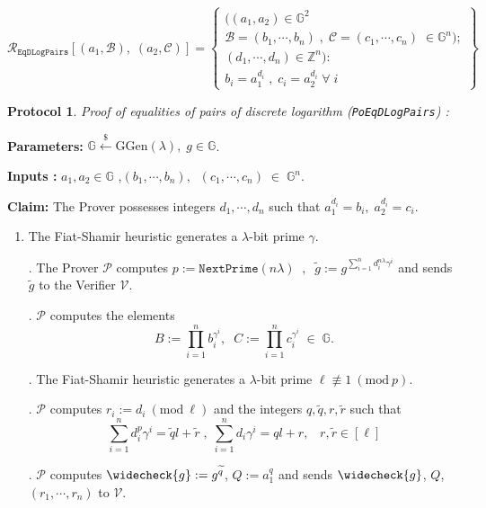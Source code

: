 \documentclass[11pt, lettersize, notitlepage, leqno, footskip=0.6cm]{article}
\newcommand{\slim}{\sum\limits}
\newcommand{\ttt}{\texttt}
\newcommand{\wti}{\widetilde}
\newcommand{\mc}{\mathcal}
\newcommand{\mb}{\mathbb}
\newcommand{\mr}{\mathrm}
\newcommand{\lam}{\lambda}
\newcommand{\lamb}{\lambda}
\newcommand{\weck}{\widecheck}
\newcommand{\mP}{\mc{P}}
\newcommand{\V}{\mc{V}}
\newcommand{\vs}{\vspace{-0.15cm}}
\newcommand{\noin}{\noindent}
\newcommand{\Mod}[1]{\ (\mathrm{mod}\ #1)}
\newtheorem{Prot}[Thm]{Protocol}
\numberwithin{equation}{section}
\begin{document}
{\[
  \mc{R}_{{\ttt{EqDLogPairs}}}[(a_1, \mc{B}),\; (a_2, \mc{C})] = \left\{\begin{array}{l}
  	((a_1, a_2)\in\mb{G}^2\\
    \mc{B} = (b_1,\cdots, b_n)\;,\;\mc{C} = (c_1,\cdots, c_n)\;\in\mb{G}^n);\\
    (d_1,\cdots,d_n)\in\mb{Z}^n): \\
    b_i = a_1^{d_i}\;,\;c_i = a_2^{d_i} \;\forall\;i
  \end{array}\right\}
\]

\vspace{0.2cm}


\begin{Prot} \normalfont \textit{Proof of equalities of pairs of discrete logarithm} (\verb|PoEqDLogPairs|) :\end{Prot} \vspace{-0.3cm}

\noindent \textbf{Parameters:} $\mb{G}\xleftarrow{\$} \mr{GGen}(\lamb), \; g\in \mb{G}$.

\noindent \textbf{Inputs :} $a_1,a_2\in\mb{G}$  \;,\;$(b_1,\cdots, b_n), \;\;(c_1,\cdots, c_n)\;\in\; \mb{G}^n$.


\noindent \textbf{Claim:} The Prover possesses integers $d_1,\cdots, d_n$ such that $a_1^{d_i} = b_i,\; a_2^{d_i} = c_i$.

\begin{enumerate}[wide, labelwidth=!, labelindent=0pt]\vs \item The Fiat-Shamir heuristic generates a $\lam$-bit prime $\gamma$.

\noin 2. The Prover $\mP$ computes $p:= \ttt{NextPrime}(n\lam)\;\;,\;\;\wti{g} := g^{\slim_{i=1}^n d_i^{n\lam}\gamma^i}$ and sends $\wti{g}$ to the Verifier $\V$.
 
\noin 3. $\mc{P}$ computes the elements \vspace{-0.2cm} $$B:= \prod\limits_{i=1}^n b_i^{\gamma^i},\;\;C:= \prod\limits_{i=1}^n c_i^{\gamma^i}\;\in\; \mb{G}.$$

\noin 4. The Fiat-Shamir heuristic generates a $\lam$-bit prime $\ell\not\equiv 1\Mod{p}$.

\noin 5. $\mP$ computes $r_i:= d_i\Mod{\ell}$ and the integers $q,\wti{q}, r,\wti{r}$ such that \vs $$\slim_{i=1}^n d_i^{p}\gamma^i = \wti{q}l+\wti{r}\;,\;\slim_{i=1}^n d_i\gamma^i = ql+r,\;\;\;r,\wti{r}\in[\ell]$$

\noin 6. $\mP$ computes $\weck{g}:= g^{\wti{q}}$, $Q:= a_1^q$ and sends $\weck{g}$, $Q$, $(r_1,\cdots,r_n)$ to $\V$.   
 

\end{enumerate}}
\end{document}
